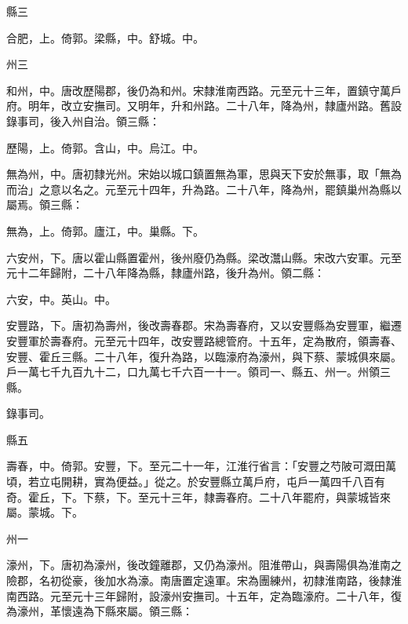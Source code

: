 \begin{pinyinscope}
 縣三



 合肥，上。倚郭。梁縣，中。舒城。中。



 州三



 和州，中。唐改歷陽郡，後仍為和州。宋隸淮南西路。元至元十三年，置鎮守萬戶府。明年，改立安撫司。又明年，升和州路。二十八年，降為州，隸廬州路。舊設錄事司，後入州自治。領三縣：



 歷陽，上。倚郭。含山，中。烏江。中。



 無為州，中。唐初隸光州。宋始以城口鎮置無為軍，思與天下安於無事，取「無為而治」之意以名之。元至元十四年，升為路。二十八年，降為州，罷鎮巢州為縣以屬焉。領三縣：



 無為，上。倚郭。廬江，中。巢縣。下。



 六安州，下。唐以霍山縣置霍州，後州廢仍為縣。梁改灊山縣。宋改六安軍。元至元十二年歸附，二十八年降為縣，隸廬州路，後升為州。領二縣：



 六安，中。英山。中。



 安豐路，下。唐初為壽州，後改壽春郡。宋為壽春府，又以安豐縣為安豐軍，繼遷安豐軍於壽春府。元至元十四年，改安豐路總管府。十五年，定為散府，領壽春、安豐、霍丘三縣。二十八年，復升為路，以臨濠府為濠州，與下蔡、蒙城俱來屬。戶一萬七千九百九十二，口九萬七千六百一十一。領司一、縣五、州一。州領三縣。



 錄事司。



 縣五



 壽春，中。倚郭。安豐，下。至元二十一年，江淮行省言：「安豐之芍陂可溉田萬頃，若立屯開耕，實為便益。」從之。於安豐縣立萬戶府，屯戶一萬四千八百有奇。霍丘，下。下蔡，下。至元十三年，隸壽春府。二十八年罷府，與蒙城皆來屬。蒙城。下。



 州一



 濠州，下。唐初為濠州，後改鐘離郡，又仍為濠州。阻淮帶山，與壽陽俱為淮南之險郡，名初從豪，後加水為濠。南唐置定遠軍。宋為團練州，初隸淮南路，後隸淮南西路。元至元十三年歸附，設濠州安撫司。十五年，定為臨濠府。二十八年，復為濠州，革懷遠為下縣來屬。領三縣：




\end{pinyinscope}
